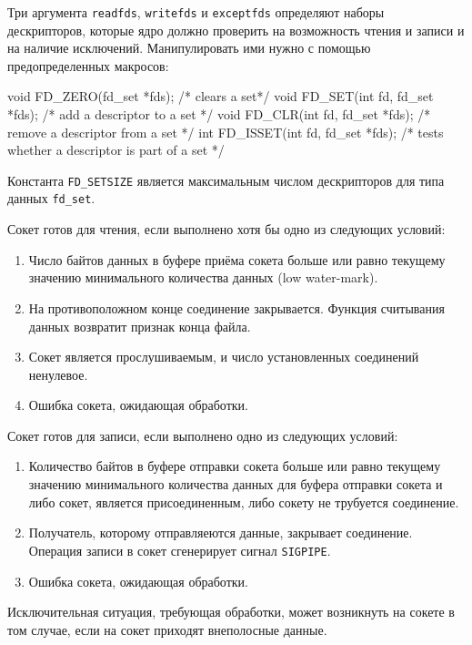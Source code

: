 Три аргумента \lstinline{readfds}, \lstinline{writefds} и \lstinline{exceptfds} определяют наборы дескрипторов, которые ядро должно проверить на возможность чтения и записи и на наличие исключений. Манипулировать ими нужно с помощью предопределенных макросов:
\begin{clst}{}{}
void FD_ZERO(fd_set *fds);           /* clears a set*/
void FD_SET(int fd, fd_set *fds);    /* add a descriptor to a set */
void FD_CLR(int fd, fd_set *fds);    /* remove a descriptor from a set */
int  FD_ISSET(int fd, fd_set *fds);  /* tests whether a descriptor is
                                        part of a set */
\end{clst}

Константа \lstinline{FD_SETSIZE} является максимальным числом дескрипторов для типа данных \lstinline{fd_set}.

Сокет готов для чтения, если выполнено хотя бы одно из следующих условий:
\begin{enumerate}
  \item Число байтов данных в буфере приёма сокета больше или равно текущему значению минимального количества данных (low water-mark).
  \item На противоположном конце соединение закрывается. Функция считывания данных возвратит признак конца файла.
  \item Сокет является прослушиваемым, и число установленных соединений ненулевое.
  \item Ошибка сокета, ожидающая обработки.
\end{enumerate}

Сокет готов для записи, если выполнено одно из следующих условий:
\begin{enumerate}
  \item Количество байтов в буфере отправки сокета больше или равно текущему значению минимального количества данных для буфера отправки сокета и либо сокет, является присоединенным, либо сокету не трубуется соединение.
  \item Получатель, которому отправляеются данные, закрывает соединение. Операция записи в сокет сгенерирует сигнал \lstinline{SIGPIPE}.
  \item Ошибка сокета, ожидающая обработки.
\end{enumerate}

Исключительная ситуация, требующая обработки, может возникнуть на сокете в том случае, если на сокет приходят внеполосные данные.

